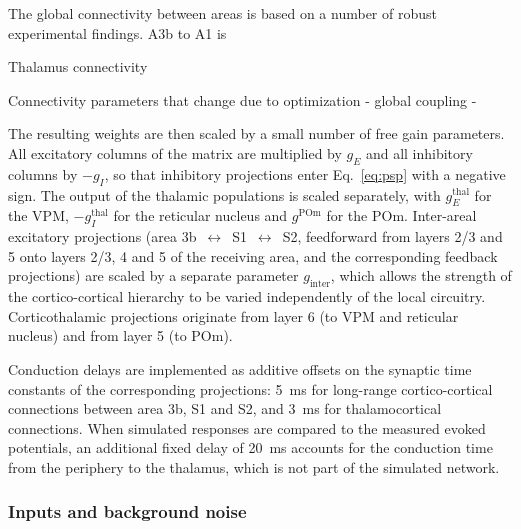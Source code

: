 \documentclass[11pt,a4paper,onecolumn]{article}
\begin{document}
The global connectivity between areas is based on a number of robust experimental findings. 
A3b to A1 is 

Thalamus connectivity


Connectivity parameters that change due to optimization
- global coupling
- 


The resulting weights are then scaled by a small number of free gain parameters. All excitatory columns of the matrix are multiplied by $g_E$ and all inhibitory columns by $-g_I$, so that inhibitory projections enter Eq.~\eqref{eq:psp} with a negative sign. The output of the thalamic populations is scaled separately, with $g_{E}^{\mathrm{thal}}$ for the VPM, $-g_{I}^{\mathrm{thal}}$ for the reticular nucleus and $g^{\mathrm{POm}}$ for the POm. Inter-areal excitatory projections (area 3b~$\leftrightarrow$~S1~$\leftrightarrow$~S2, feedforward from layers 2/3 and 5 onto layers 2/3, 4 and 5 of the receiving area, and the corresponding feedback projections) are scaled by a separate parameter $g_{\mathrm{inter}}$, which allows the strength of the cortico-cortical hierarchy to be varied independently of the local circuitry. Corticothalamic projections originate from layer 6 (to VPM and reticular nucleus) and from layer 5 (to POm).

Conduction delays are implemented as additive offsets on the synaptic time constants of the corresponding projections: 5~ms for long-range cortico-cortical connections between area 3b, S1 and S2, and 3~ms for thalamocortical connections. When simulated responses are compared to the measured evoked potentials, an additional fixed delay of 20~ms accounts for the conduction time from the periphery to the thalamus, which is not part of the simulated network.

\subsubsection*{Inputs and background noise}
\vspace{-7pt}
\end{document}
